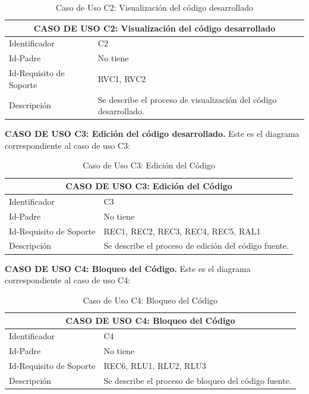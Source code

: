 \begin{table}[h]
\centering
\begin{tabular}{ | p{} | p{} | }
	\hline
	\multicolumn{2}{|c|}{CASO DE USO C2: Visualización del código desarrollado} \\
	\hline
	Identificador  & C2 \\
	\hline 
	Id-Padre & No tiene \\
	\hline
	Id-Requisito de Soporte & RVC1, RVC2 \\
	\hline
	Descripción & Se describe el proceso de visualización del código desarrollado. \\
	\hline
\end{tabular}
\caption{Caso de Uso C2: Visualización del código desarrollado}
\end{table}

\newpage

\textbf{CASO DE USO C3: Edición del código desarrollado.} Este es el diagrama correspondiente al caso de uso C3:

\begin{table}[h]
\centering
\begin{tabular}{ | p{} | p{} | }
	\hline
	\multicolumn{2}{|c|}{CASO DE USO C3: Edición del Código} \\
	\hline
	Identificador  & C3 \\
	\hline 
	Id-Padre & No tiene \\
	\hline
	Id-Requisito de Soporte & REC1, REC2, REC3, REC4, REC5, RAL1 \\
	\hline
	Descripción & Se describe el proceso de edición del código fuente. \\
	\hline
\end{tabular}
\caption{Caso de Uso C3: Edición del Código}
\end{table}

\vspace{2cm}

\textbf{CASO DE USO C4: Bloqueo del Código.} Este es el diagrama correspondiente al caso de uso C4:

\begin{table}[h]
\centering
\begin{tabular}{ | p{} | p{} | }
	\hline
	\multicolumn{2}{|c|}{CASO DE USO C4: Bloqueo del Código} \\
	\hline
	Identificador  & C4 \\
	\hline 
	Id-Padre & No tiene \\
	\hline
	Id-Requisito de Soporte & REC6, RLU1, RLU2, RLU3 \\
	\hline
	Descripción & Se describe el proceso de bloqueo del código fuente. \\
	\hline
\end{tabular}
\caption{Caso de Uso C4: Bloqueo del Código}
\end{table}

